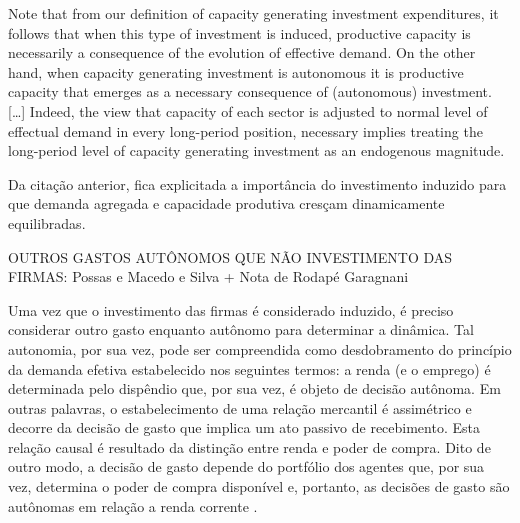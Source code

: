 \begin{citacao}
	Note that from our definition of capacity generating investment expenditures, it follows that when this type of investment is induced, productive capacity is necessarily a consequence of the evolution of effective demand. On the other hand, when capacity generating investment is autonomous it is productive capacity that emerges as a necessary consequence of (autonomous) investment. […] Indeed, the view that capacity of each sector is adjusted to normal level of effectual demand in every long-period position, necessary implies treating the long-period level of capacity generating investment as an endogenous magnitude. \cite[p.~77]{serrano_sraffian_1995}
\end{citacao}
Da citação anterior, fica explicitada a importância do investimento induzido para que demanda agregada e capacidade produtiva cresçam dinamicamente equilibradas.


OUTROS GASTOS AUTÔNOMOS QUE NÃO INVESTIMENTO DAS FIRMAS: Possas e Macedo e Silva + Nota de Rodapé Garagnani

Uma vez que o investimento das firmas é considerado induzido, é preciso considerar outro gasto enquanto autônomo para determinar a dinâmica.
Tal autonomia, por sua vez, pode ser compreendida como desdobramento do princípio da demanda efetiva estabelecido nos seguintes termos: a renda (e o emprego) é determinada pelo dispêndio que, por sua vez, é objeto de decisão autônoma. Em outras palavras, o estabelecimento de uma relação mercantil é assimétrico e decorre da decisão de gasto que implica um ato passivo de recebimento. 
Esta relação causal é resultado da distinção entre renda e poder de compra. Dito de outro modo, a decisão de gasto depende do portfólio dos agentes que, por sua vez, determina o poder de compra disponível e, portanto, as decisões de gasto são autônomas em relação a renda corrente  \cites{possas_demanda_1981}[p.~47--72]{possas_dinamica_1987}[p.~1--9]{macedo_e_silva_macroeconomia_1999}.

